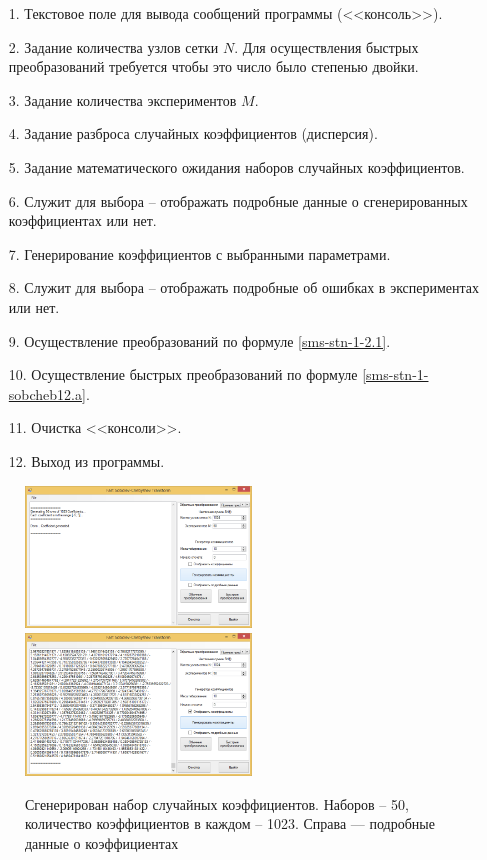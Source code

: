 \begin{enumerate}
	\item[1.] Текстовое поле для вывода сообщений программы (<<консоль>>).
	\item[2.] Задание количества узлов сетки $N$. Для осуществления быстрых преобразований требуется чтобы это число было степенью двойки.
	\item[3.] Задание количества экспериментов $M$.
	\item[4.] Задание разброса случайных коэффициентов (дисперсия).
	\item[5.] Задание математического ожидания наборов случайных коэффициентов.
	\item[6.] Служит для выбора -- отображать подробные данные о сгенерированных коэффициентах или нет.
	\item[7.] Генерирование коэффициентов с выбранными параметрами.
	\item[8.] Служит для выбора -- отображать подробные об ошибках в экспериментах или нет.
	\item[9.] Осуществление преобразований по формуле \eqref{sms-stn-1-2.1}.
	\item[10.] Осуществление быстрых преобразований по формуле \eqref{sms-stn-1-sobcheb12.a}.
	\item[11.] Очистка <<консоли>>.
	\item[12.] Выход из программы.
\end{enumerate}

\begin{figure}[H]
	\begin{center}
		\includegraphics[width=170pt]{pictures/sms-stn-1(2)}
		\quad
		\includegraphics[width=170pt]{pictures/sms-stn-1(3)}
		\caption{
			Сгенерирован набор случайных коэффициентов. Наборов -- 50, количество коэффициентов в каждом -- 1023. Справа --- подробные данные о коэффициентах
		}\label{sms-stn-1-img2}
	\end{center}
\end{figure}

